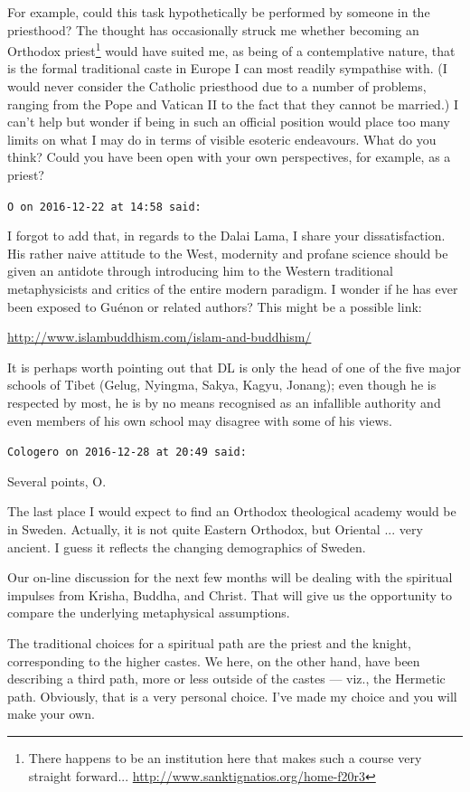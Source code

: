 \begin{footnotesize}
\begin{sffamily}
For example, could this task hypothetically be performed by someone in the priesthood? The thought has occasionally struck me whether becoming an Orthodox priest\footnote{There happens to be an institution here that makes such a course very straight forward... \url{http://www.sanktignatios.org/home-f20r3}} would have suited me, as being of a contemplative nature, that is the formal traditional caste in Europe I can most readily sympathise with. (I would never consider the Catholic priesthood due to a number of problems, ranging from the Pope and Vatican II to the fact that they cannot be married.) I can't help but wonder if being in such an official position would place too many limits on what I may do in terms of visible esoteric endeavours. What do you think? Could you have been open with your own perspectives, for example, as a priest?

\hfill

\texttt{O on 2016-12-22 at 14:58 said:}

I forgot to add that, in regards to the Dalai Lama, I share your dissatisfaction. His rather naive attitude to the West, modernity and profane science should be given an antidote through introducing him to the Western traditional metaphysicists and critics of the entire modern paradigm. I wonder if he has ever been exposed to Guénon or related authors? This might be a possible link:

\url{http://www.islambuddhism.com/islam-and-buddhism/}


It is perhaps worth pointing out that DL is only the head of one of the five major schools of Tibet (Gelug, Nyingma, Sakya, Kagyu, Jonang); even though he is respected by most, he is by no means recognised as an infallible authority and even members of his own school may disagree with some of his views.

\hfill

\texttt{Cologero on 2016-12-28 at 20:49 said:}

Several points, O.

The last place I would expect to find an Orthodox theological academy would be in Sweden. Actually, it is not quite Eastern Orthodox, but Oriental ... very ancient. I guess it reflects the changing demographics of Sweden.

Our on-line discussion for the next few months will be dealing with the spiritual impulses from Krisha, Buddha, and Christ. That will give us the opportunity to compare the underlying metaphysical assumptions.

The traditional choices for a spiritual path are the priest and the knight, corresponding to the higher castes. We here, on the other hand, have been describing a third path, more or less outside of the castes --- viz., the Hermetic path. Obviously, that is a very personal choice. I've made my choice and you will make your own.

\hfill

\end{sffamily}
\end{footnotesize}

